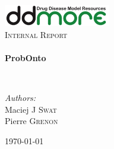 \begin{titlepage}
\begin{center}

\includegraphics[width=0.35\textwidth]{./logo/ddmore_logo}~\\[1cm]

%
\textsc{\Large Internal Report}\\[0.5cm]

\HRule \\[0.4cm]
{ \huge \bfseries ProbOnto \\[0.4cm] }

\HRule \\[1.5cm]

\begin{minipage}{0.5\textwidth}
\begin{flushleft} \large
\emph{Authors:}\\
Maciej J \textsc{Swat}\\
Pierre \textsc{Grenon}\\
\end{flushleft}
\end{minipage}


\vfill

{\large \today \\}

\end{center}
\end{titlepage}